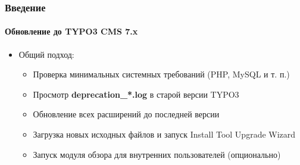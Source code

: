 
\begin{frame}[fragile]
	\frametitle{Введение}
	\framesubtitle{Обновление до TYPO3 CMS 7.x}

	\begin{itemize}
		\item Общий подход:
			\begin{itemize}
				\item Проверка минимальных системных требований \small(PHP, MySQL и т. п.)
				\item Просмотр \textbf{deprecation\_*.log} в старой версии TYPO3
				\item Обновление всех расширений до последней версии
				\item Загрузка новых исходных файлов и запуск Install Tool \textrightarrow Upgrade Wizard
				\item Запуск модуля обзора для внутренних пользователей (опционально)
			\end{itemize}
	\end{itemize}

\end{frame}


